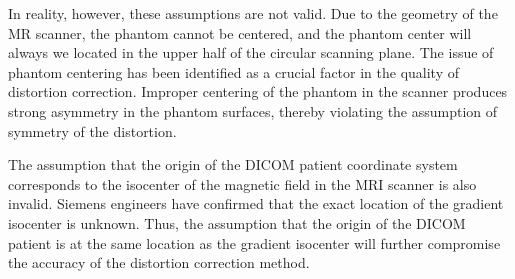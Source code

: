 
In reality, however, these assumptions are not valid. Due to the geometry of the MR scanner,
the phantom cannot be centered, and the phantom center will always we located in the upper half of the
circular scanning plane. The issue of phantom centering has been identified as a crucial factor in the
quality of distortion correction. Improper centering of the phantom in the scanner produces strong asymmetry
in the phantom surfaces, thereby violating the assumption of symmetry of the distortion.


The assumption that the origin of the DICOM patient coordinate system corresponds to the isocenter of the magnetic field in the MRI scanner is also invalid. Siemens engineers have confirmed that the exact location of the gradient isocenter is unknown. Thus, the assumption that the origin of the DICOM patient is at the same location as the gradient isocenter will further compromise the accuracy of the distortion correction method.


